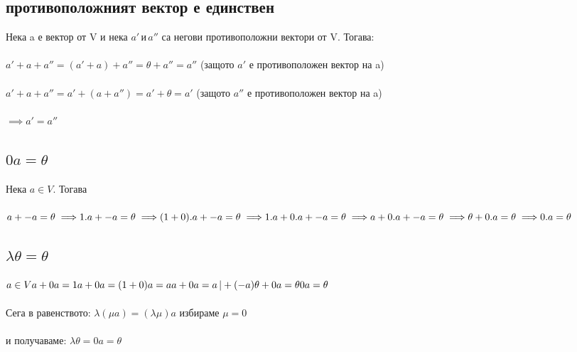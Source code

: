 \documentclass[12pt]{article}
\begin{document}
    \subsection{противоположният вектор е единствен}
    Нека a е вектор от V и нека \(a' \, \text{и} \, a''\) са негови противоположни вектори от V. Тогава:\\\\
    \(a' + a + a'' = (a' + a) + a'' = \theta + a'' = a''\) (защото \(a'\) е противоположен вектор на a)\\\\
    \(a' + a + a'' = a' + (a + a'') = a' + \theta = a'\) (защото \(a''\) е противоположен вектор на a)\\\\
    \(\implies a' = a''\)
    \subsection{\(0a = \theta\)}
    Нека \(a \in V\). Тогава\\\\
    \(a + -a = \theta \implies \\\\
    1.a + -a = \theta \implies \\\\
    (1 + 0).a + -a = \theta \implies \\\\
    1.a + 0.a + -a = \theta \implies \\\\
    a + 0.a + -a = \theta \implies \\\\
    \theta + 0.a = \theta \implies \\\\
    0.a = \theta\)
    \subsection{\(\lambda \theta = \theta\)}
    \(a \in V\\\\
    a + 0a = 1a + 0a = (1 + 0)a = a\\\\
    a + 0a = a \, | + (-a)\\\\
    \theta + 0a = \theta\\\\
    0a = \theta\)\\\\
    Сега в равенството: \(\lambda(\mu a) = (\lambda \mu)a \) избираме \(\mu = 0\) \\\\
    и получаваме: \(\lambda \theta = 0a = \theta\)
\end{document}
